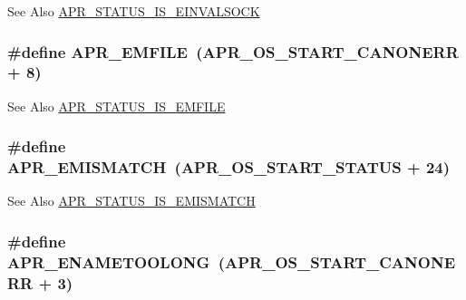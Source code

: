 \begin{DoxySeeAlso}{See Also}
\hyperlink{group___a_p_r___s_t_a_t_u_s___i_s_ga7fcc752663660de85fa046b2de014b97}{A\-P\-R\-\_\-\-S\-T\-A\-T\-U\-S\-\_\-\-I\-S\-\_\-\-E\-I\-N\-V\-A\-L\-S\-O\-C\-K} 
\end{DoxySeeAlso}
\hypertarget{group___a_p_r___error_gaec391eaf0bfa6aed03457ed3f796942d}{
\subsubsection[{A\-P\-R\-\_\-\-E\-M\-F\-I\-L\-E}]{\setlength{\rightskip}{0pt plus 5cm}\#define A\-P\-R\-\_\-\-E\-M\-F\-I\-L\-E~({\bf A\-P\-R\-\_\-\-O\-S\-\_\-\-S\-T\-A\-R\-T\-\_\-\-C\-A\-N\-O\-N\-E\-R\-R} + 8)}}\label{group___a_p_r___error_gaec391eaf0bfa6aed03457ed3f796942d}
\begin{DoxySeeAlso}{See Also}
\hyperlink{group___a_p_r___s_t_a_t_u_s___i_s_gae50825e6293023c570a92d185b38e393}{A\-P\-R\-\_\-\-S\-T\-A\-T\-U\-S\-\_\-\-I\-S\-\_\-\-E\-M\-F\-I\-L\-E} 
\end{DoxySeeAlso}
\hypertarget{group___a_p_r___error_ga31e65a44daba96aa6d943529e94498e7}{
\subsubsection[{A\-P\-R\-\_\-\-E\-M\-I\-S\-M\-A\-T\-C\-H}]{\setlength{\rightskip}{0pt plus 5cm}\#define A\-P\-R\-\_\-\-E\-M\-I\-S\-M\-A\-T\-C\-H~({\bf A\-P\-R\-\_\-\-O\-S\-\_\-\-S\-T\-A\-R\-T\-\_\-\-S\-T\-A\-T\-U\-S} + 24)}}\label{group___a_p_r___error_ga31e65a44daba96aa6d943529e94498e7}
\begin{DoxySeeAlso}{See Also}
\hyperlink{group___a_p_r___s_t_a_t_u_s___i_s_ga7234b0d01a8e3ea8e5345f3f242df030}{A\-P\-R\-\_\-\-S\-T\-A\-T\-U\-S\-\_\-\-I\-S\-\_\-\-E\-M\-I\-S\-M\-A\-T\-C\-H} 
\end{DoxySeeAlso}
\hypertarget{group___a_p_r___error_ga3db63b16c2b332efe441e2661f593377}{
\subsubsection[{A\-P\-R\-\_\-\-E\-N\-A\-M\-E\-T\-O\-O\-L\-O\-N\-G}]{\setlength{\rightskip}{0pt plus 5cm}\#define A\-P\-R\-\_\-\-E\-N\-A\-M\-E\-T\-O\-O\-L\-O\-N\-G~({\bf A\-P\-R\-\_\-\-O\-S\-\_\-\-S\-T\-A\-R\-T\-\_\-\-C\-A\-N\-O\-N\-E\-R\-R} + 3)}}\label{group___a_p_r___error_ga3db63b16c2b332efe441e2661f593377}
